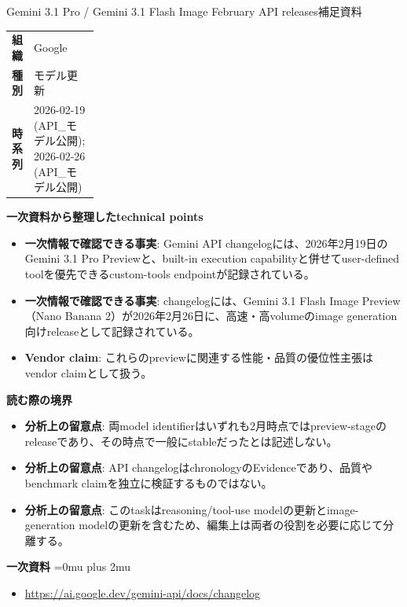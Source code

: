 \begin{technicalnote}{Gemini 3.1 Pro / Gemini 3.1 Flash Image February API releases}{補足資料}
\begingroup
\begin{tabularx}{\linewidth}{@{}>{\bfseries}p{0.22\linewidth}X@{}}
組織 & Google \\
種別 & モデル更新 \\
時系列 & 2026-02-19 (API\_モデル公開); 2026-02-26 (API\_モデル公開) \\
\end{tabularx}
\smallskip
{\bfseries 一次資料から整理したtechnical points}
\begin{itemize}[leftmargin=1.5em,itemsep=0.35em]
\item \textbf{一次情報で確認できる事実}: Gemini API changelogには、2026年2月19日のGemini 3.1 Pro Previewと、built-in execution capabilityと併せてuser-defined toolを優先できるcustom-tools endpointが記録されている。
\item \textbf{一次情報で確認できる事実}: changelogには、Gemini 3.1 Flash Image Preview（Nano Banana 2）が2026年2月26日に、高速・高volumeのimage generation向けreleaseとして記録されている。
\item \textbf{Vendor claim}: これらのpreviewに関連する性能・品質の優位性主張はvendor claimとして扱う。
\end{itemize}
\begin{minipage}{\linewidth}
{\bfseries 読む際の境界}
\begin{itemize}[leftmargin=1.5em,itemsep=0.35em]
\item \textbf{分析上の留意点}: 両model identifierはいずれも2月時点ではpreview-stageのreleaseであり、その時点で一般にstableだったとは記述しない。
\item \textbf{分析上の留意点}: API changelogはchronologyのEvidenceであり、品質やbenchmark claimを独立に検証するものではない。
\item \textbf{分析上の留意点}: このtaskはreasoning/tool-use modelの更新とimage-generation modelの更新を含むため、編集上は両者の役割を必要に応じて分離する。
\end{itemize}
\begin{samepage}
{\bfseries 一次資料}
\begingroup\sloppy
\Urlmuskip=0mu plus 2mu\relax
\begin{itemize}[leftmargin=1.5em,itemsep=0.25em]
\item {\scriptsize\url{https://ai.google.dev/gemini-api/docs/changelog}}
\end{itemize}
\endgroup
\end{samepage}
\end{minipage}
\endgroup
\end{technicalnote}
\medskip

